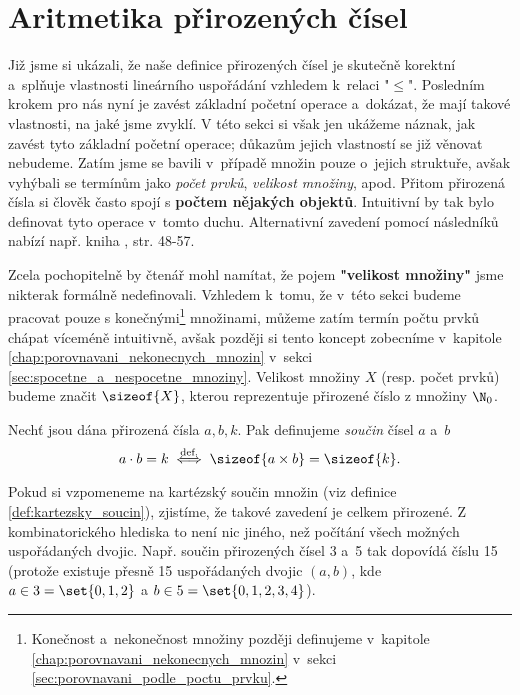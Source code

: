 \section{Aritmetika přirozených čísel}\label{sec:aritmetika_prirozenych_cisel}
Již jsme si ukázali, že naše definice přirozených čísel je skutečně korektní a~splňuje vlastnosti lineárního uspořádání vzhledem k~relaci "$\leq$". Posledním krokem pro nás nyní je zavést základní početní operace a~dokázat, že mají takové vlastnosti, na jaké jsme zvyklí. V této sekci si však jen ukážeme náznak, jak zavést tyto základní početní operace; důkazům jejich vlastností se již věnovat nebudeme. Zatím jsme se bavili v~případě množin pouze o~jejich struktuře, avšak vyhýbali se termínům jako \emph{počet prvků}, \emph{velikost množiny}, apod. Přitom přirozená čísla si člověk často spojí s \textbf{počtem nějakých objektů}. Intuitivní by tak bylo definovat tyto operace v~tomto duchu. Alternativní zavedení pomocí následníků nabízí např. kniha \cite{Goldrei2017}, str. 48-57.\par
Zcela pochopitelně by čtenář mohl namítat, že pojem \textbf{"velikost množiny"} jsme nikterak formálně nedefinovali. Vzhledem k~tomu, že v~této sekci budeme pracovat pouze s konečnými\footnote{Konečnost a~nekonečnost množiny později definujeme v~kapitole \ref{chap:porovnavani_nekonecnych_mnozin} v~sekci \ref{sec:porovnavani_podle_poctu_prvku}.} množinami, můžeme zatím termín počtu prvků chápat víceméně intuitivně, avšak později si tento koncept zobecníme v~kapitole \ref{chap:porovnavani_nekonecnych_mnozin} v~sekci \ref{sec:spocetne_a_nespocetne_mnoziny}. Velikost množiny $X$ (resp. počet prvků) budeme značit $\sizeof{X}$, kterou reprezentuje přirozené číslo z množiny $\N_0$.\par
\begin{definition}\label{def:soucin_pritozenych_cisel}
    Nechť jsou dána přirozená čísla $a,b,k$. Pak definujeme \emph{součin} čísel $a$ a~$b$
    \begin{equation*}
        a\cdot b=k\stackrel{\text{def.}}{\iff} \sizeof{a\times b}=\sizeof{k}.
    \end{equation*}
\end{definition}
Pokud si vzpomeneme na kartézský součin množin (viz definice \ref{def:kartezsky_soucin}), zjistíme, že takové zavedení je celkem přirozené. Z kombinatorického hlediska to není nic jiného, než počítání všech možných uspořádaných dvojic. Např. součin přirozených čísel 3 a~5 tak dopovídá číslu 15 (protože existuje přesně 15 uspořádaných dvojic $(a,b)$, kde $a\in 3=\set{0,1,2}$ a $b\in 5=\set{0,1,2,3,4}$).\par
